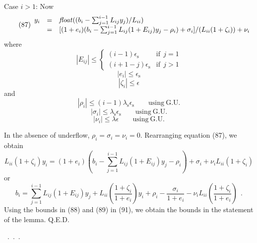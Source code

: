 \documentclass[a4paper]{article}
\begin{document}
\noindent Case $i>1$: Now
\begin{equation}\tag{87}
\begin{array}{lcl}
  y_i & = & \mathit{float}((b_i - \sum_{j=1}^{i-1}L_{ij}y_j)/L_{ii})\\
  & = & [(1+e_i)(b_i - \sum_{j=1}^{i-1}L_{ij}(1+E_{ij})y_j-\rho_i)+\sigma_i]/
  (L_{ii}(1+\zeta_i))+\nu_i
  \end{array}
\end{equation}
where
\begin{equation}\tag{88a}
  |E_{ij}|\le\left\lbrace \begin{array}{ll}(i-1)\epsilon_\mathrm{s} & \mathrm{if}~~j=1\\
    (i+1-j)\epsilon_\mathrm{s} & \mathrm{if}~~j>1 \end{array}\right.
\end{equation}
\begin{equation}\tag{88b}
|e_i|\le \epsilon_\mathrm{s}
\end{equation}
\begin{equation}\tag{88c}
|\zeta_i|\le \epsilon
\end{equation}
and
\begin{equation}\tag{89a}
|\rho_i|\le (i-1)\lambda_\mathrm{s}\epsilon_\mathrm{s}\qquad\mathrm{using~G.U.}
\end{equation}
\begin{equation}\tag{89b}
|\sigma_i|\le \lambda_\mathrm{s}\epsilon_\mathrm{s}\qquad\mathrm{using~G.U.}
\end{equation}
\begin{equation}\tag{89c}
|\nu_i|\le \lambda\epsilon\qquad\mathrm{using~G.U.}
\end{equation}

In the absence of underflow, $\rho_i=\sigma_i=\nu_i=0$.
Rearranging equation (87), we obtain
\begin{equation}\tag{90}
  L_{ii}(1+\zeta_i)y_i = (1+e_i)(b_i-\sum_{j=1}^{i-1}L_{ij}(1+E_{ij})y_j - \rho_i)
  + \sigma_i + \nu_iL_{ii}(1+\zeta_i)
\end{equation}
or
\begin{equation}\tag{91}
  b_i = \sum_{j=1}^{i-1}L_{ij}(1+E_{ij})y_j+L_{ii}\left(\frac{1+\zeta_i}{1+e_i}\right)y_i
  + \rho_i - \frac{\sigma_i}{1+e_i} - \nu_i L_{ii} \left(\frac{1+\zeta_i}{1+e_i}\right)~~.
\end{equation}
Using the bounds in (88) and (89) in (91), we obtain the bounds
in the statement of the lemma.  Q.E.D.

~.~.~.
\end{document}

